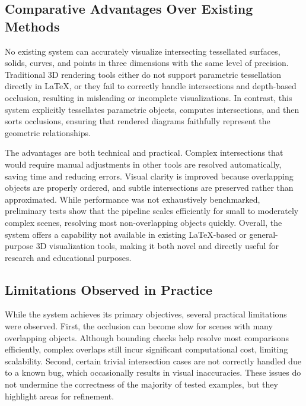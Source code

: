 \subsection{Comparative Advantages Over Existing Methods}

No existing system can accurately visualize intersecting tessellated 
surfaces, solids, curves, and points in three dimensions with the same 
level of precision. Traditional 3D rendering tools either do not support 
parametric tessellation directly in \LaTeX{}, or they fail to correctly 
handle intersections and depth-based occlusion, resulting in misleading 
or incomplete visualizations. In contrast, this system explicitly 
tessellates parametric objects, computes intersections, and then sorts 
occlusions, ensuring that rendered diagrams faithfully represent the 
geometric relationships.

The advantages are both technical and practical. Complex intersections 
that would require manual adjustments in other tools are resolved 
automatically, saving time and reducing errors. Visual clarity is 
improved because overlapping objects are properly ordered, and subtle 
intersections are preserved rather than approximated. While performance 
was not exhaustively benchmarked, preliminary tests show that the 
pipeline scales efficiently for small to moderately complex scenes, 
resolving most non-overlapping objects quickly. Overall, the system 
offers a capability not available in existing \LaTeX{}-based or 
general-purpose 3D visualization tools, making it both novel and 
directly useful for research and educational purposes.

\subsection{Limitations Observed in Practice}

While the system achieves its primary objectives, several practical 
limitations were observed. First, the occlusion can become slow for 
scenes with many overlapping objects. Although bounding checks help 
resolve most comparisons efficiently, complex overlaps still incur 
significant computational cost, limiting scalability. Second, certain 
trivial intersection cases are not correctly handled due to a known 
bug, which occasionally results in visual inaccuracies. These issues 
do not undermine the correctness of the majority of tested examples, 
but they highlight areas for refinement.


